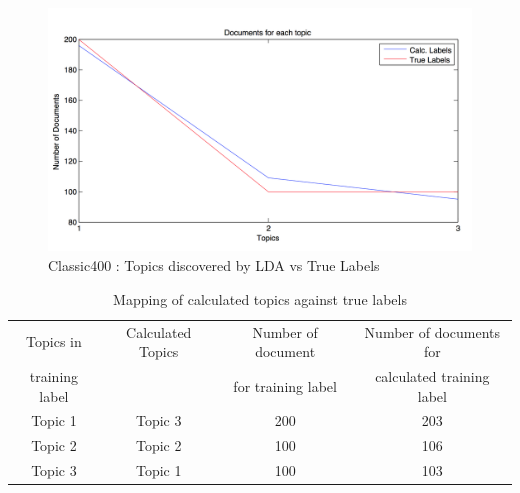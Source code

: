 \documentclass[11pt,a4paper,oneside]{article}
\begin{document}
\begin{figure}[H]
\centering
\includegraphics[width=\columnwidth]{truelabels}
\caption{Classic400 : Topics discovered by LDA vs True Labels}
\label{fig:truelabels}
\end{figure}
\begin{table}
\begin{tabular}{|c|c|c|c|}
\hline 
Topics in  & Calculated Topics & Number of document & Number of documents for  \\ 
training label & & for training label & calculated training label \\
\hline 
Topic 1 & Topic 3 & 200 & 203 \\ 
\hline 
Topic 2 & Topic 2 & 100 & 106 \\ 
\hline 
Topic 3 & Topic 1 & 100 & 103 \\ 
\hline 
\end{tabular} 
\label{tab:discovered_topics}
\caption{Mapping of calculated topics against true labels}
\end{table}
\end{document}
